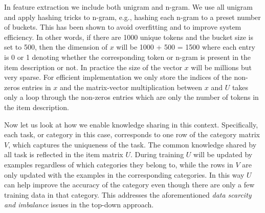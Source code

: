 In feature extraction we include both unigram and n-gram. We use all unigram and apply hashing tricks \cite{weinberger2009feature} to n-gram, e.g., hashing each n-gram to a preset number of buckets. This has been shown to avoid overfitting and to improve system efficiency. In other words, if there are 1000 unique tokens and the bucket size is set to 500, then the dimension of $x$ will be 1000 + 500 = 1500 where each entry is 0 or 1 denoting whether the corresponding token or n-gram is present in the item description or not. In practice the size of the vector $x$ will be millions but very sparse. For efficient implementation we only store the indices of the non-zeros entries in $x$ and the matrix-vector multiplication between $x$ and $U$ takes only a loop through the non-zeros entries which are only the number of tokens in the item description. 

Now let us look at how we enable knowledge sharing in this context. Specifically, each task, or category in this case, corresponds to one row of the category matrix $V$, which captures the uniqueness of the task. The common knowledge shared by all task is reflected in the item matrix $U$. During training $U$ will be updated by examples regardless of which categories they belong to, while the rows in $V$ are only updated with the examples in the corresponding categories. In this way $U$ can help improve the accuracy of the category even though there are only a few training data in that category. This addresses the aforementioned \emph{data scarcity and imbalance} issues in the top-down approach.


